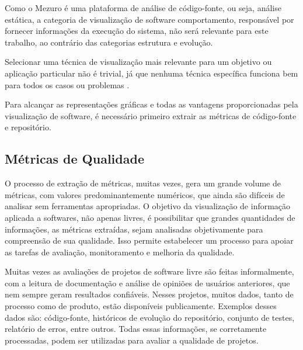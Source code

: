 Como o Mezuro é uma plataforma de análise de código-fonte, ou seja, análise estática, a categoria de visualização de software comportamento, responsável por fornecer informações da execução do sistema, não será relevante para este trabalho, ao contrário das categorias estrutura e evolução.

Selecionar uma técnica de visualização mais relevante para um objetivo ou aplicação particular não é trivial, já que nenhuma técnica específica funciona bem para todos os casos ou problemas \cite{rafaelmessiasmartins2012}.


Para alcançar as representações gráficas e todas as vantagens proporcionadas pela visualização de software, é necessário primeiro extrair as métricas de código-fonte e repositório.

\subsection{Métricas de Qualidade}

O processo de extração de métricas, muitas vezes, gera um grande volume de métricas, com valores predominantemente numéricos, que ainda são difíceis de analisar sem ferramentas apropriadas. O objetivo da visualização de informação aplicada a softwares, não apenas livres, é possibilitar que grandes quantidades de informações, as métricas extraídas, sejam analisadas objetivamente para compreensão de sua qualidade. Isso permite estabelecer um processo para apoiar as tarefas de avaliação, monitoramento e melhoria da qualidade.

Muitas vezes as avaliações de projetos de software livre são feitas informalmente, com a leitura de documentação e análise de opiniões de usuários anteriores, que nem sempre geram resultados confiáveis. Nesses projetos, muitos dados, tanto de processo como de produto, estão disponíveis publicamente. Exemplos desses dados são: código-fonte, históricos de evolução do repositório, conjunto de testes, relatório de erros, entre outros. Todas essas informações, se corretamente processadas, podem ser utilizadas para avaliar a qualidade de projetos. 

